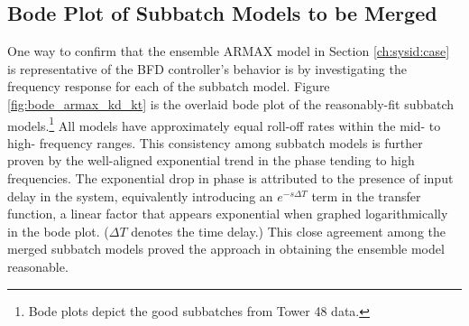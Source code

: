 \subsection{Bode Plot of Subbatch Models to be Merged}


One way to confirm that the ensemble ARMAX model in Section \ref{ch:sysid:case} is representative of the BFD controller's behavior is by investigating the frequency response for each of the subbatch model. Figure \ref{fig:bode_armax_kd_kt} is the overlaid bode plot of the reasonably-fit subbatch models.\footnote{Bode plots depict the good subbatches from Tower 48 data.} All models have approximately equal roll-off rates within the mid- to high- frequency ranges. This consistency among subbatch models is further proven by the well-aligned exponential trend in the phase tending to high frequencies. The exponential drop in phase is attributed to the presence of input delay in the system, equivalently introducing an $e^{-s\Delta T}$ term in the transfer function, a linear factor that appears exponential when graphed logarithmically in the bode plot. ($\Delta T$ denotes the time delay.) This close agreement among the merged subbatch models proved the approach in obtaining the ensemble model reasonable. 

